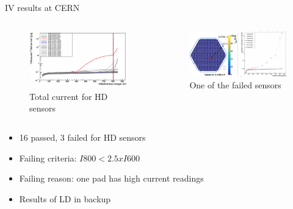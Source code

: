 \documentclass{beamer}
\begin{document}
\begin{frame}{IV results at CERN }
   \begin{columns}
        \begin{figure}
            \includegraphics[width=1.0\textwidth]{plots/HD_totalIV.png}
            \caption{Total current for HD sensors}
        \end{figure}

        \begin{figure}
            \includegraphics[width=1.0\textwidth]{plots/failedSensor_HD.png}
            \caption{One of the failed sensors}
        \end{figure}

    \end{columns}

    \begin{itemize}
        \item \alert{16 passed}, \alert{3 failed} for HD sensors
        \item Failing criteria: $ I800 < 2.5 x I600 $
        \item Failing reason: one pad has high current readings
        \item Results of LD in backup
    \end{itemize}

\end{frame}
\end{document}
